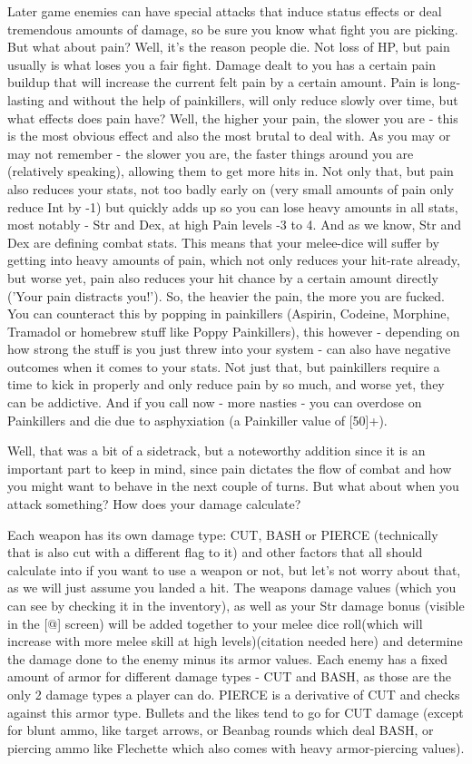 \documentclass[11pt]{report}
\begin{document}
Later game enemies can have special attacks that induce status effects or deal tremendous amounts of damage, so be sure you know what fight you are picking.
But what about pain? Well, it's the reason people die. Not loss of HP, but pain usually is what loses you a fair fight. Damage dealt to you has a certain pain buildup that will increase the current felt pain by a certain amount. Pain is long-lasting and without the help of painkillers, will only reduce slowly over time, but what effects does pain have?
Well, the higher your pain, the slower you are - this is the most obvious effect and also the most brutal to deal with. As you may or may not remember - the slower you are, the faster things around you are (relatively speaking), allowing them to get more hits in. Not only that, but pain also reduces your stats, not too badly early on (very small amounts of pain only reduce Int by -1) but quickly adds up so you can lose heavy amounts in all stats, most notably - Str and Dex, at high Pain levels -3 to 4. And as we know, Str and Dex are defining combat stats. This means that your melee-dice will suffer by getting into heavy amounts of pain, which not only reduces your hit-rate already, but worse yet, pain also reduces your hit chance by a certain amount directly ('Your pain distracts you!'). So, the heavier the pain, the more you are fucked. You can counteract this by popping in painkillers (Aspirin, Codeine, Morphine, Tramadol or homebrew stuff like Poppy Painkillers), this however - depending on how strong the stuff is you just threw into your system - can also have negative outcomes when it comes to your stats. Not just that, but painkillers require a time to kick in properly and only reduce pain by so much, and worse yet, they can be addictive. And if you call now - more nasties - you can overdose on Painkillers and die due to asphyxiation (a Painkiller value of [50]+).

Well, that was a bit of a sidetrack, but a noteworthy addition since it is an important part to keep in mind, since pain dictates the flow of combat and how you might want to behave in the next couple of turns. But what about when you attack something? How does your damage calculate?

Each weapon has its own damage type: CUT, BASH or PIERCE (technically that is also cut with a different flag to it)
and other factors that all should calculate into if you want to use a weapon or not, but let's not worry about that, as we will just assume you landed a hit. The weapons damage values (which you can see by checking it in the inventory), as well as your Str damage bonus (visible in the [@] screen) will be added together to your melee dice roll(which will increase with more melee skill at high levels)(citation needed here) and determine the damage done to the enemy minus its armor values. Each enemy has a fixed amount of armor for different damage types - CUT and BASH, as those are the only 2 damage types a player can do. PIERCE is a derivative of CUT and checks against this armor type. Bullets and the likes tend to go for CUT damage (except for blunt ammo, like target arrows, or Beanbag rounds which deal BASH, or piercing ammo like Flechette which also comes with heavy armor-piercing values).
\end{document}
